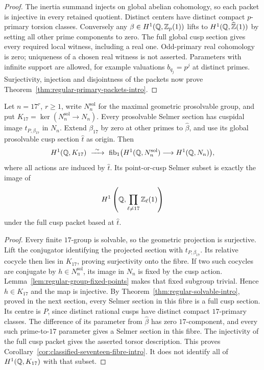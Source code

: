 \begin{proof}
The inertia summand injects on global abelian cohomology, so each
packet is injective in every retained quotient. Distinct centers
have distinct compact $p$-primary torsion classes.
Conversely any $\beta\in H^1(\mathbb Q,\mathbb Z_p(1))$ lifts to
$H^1(\mathbb Q,\widehat{\mathbb Z}(1))$ by setting all other prime components to zero.
The full global cusp section gives every required local witness,
including a real one. Odd-primary real cohomology is zero;
uniqueness of a chosen real witness is not asserted.
Parameters with infinite support are allowed, for example
valuations $b_{q_j}=p^j$ at distinct primes.
Surjectivity, injection and disjointness of the packets now prove
Theorem~\ref{thm:regular-primary-packets-intro}.
\end{proof}

\begin{corollary}
\label{cor:classified-seventeen-kernel-fibre}
Let $n=17^r$, $r\ge1$, write $N_n^{\mathrm{sol}}$ for the
maximal geometric prosolvable group, and put
$K_{17}=\ker(N_n^{\mathrm{sol}}\to N_n)$.
Every prosolvable Selmer section has cuspidal image
$t_{P,\beta_{17}}$ in $N_n$.
Extend $\beta_{17}$ by zero at other primes to $\widehat\beta$,
and use its global prosolvable cusp section $\widehat t$ as origin.
Then
\[
 H^1(\Q,K_{17})\ \xrightarrow{\ \sim\ }\
 \operatorname{fib}_{1}\bigl(H^1(\Q,N_n^{\mathrm{sol}})
                    \longrightarrow H^1(\Q,N_n)\bigr),
\]
where all actions are induced by $\widehat t$.
Its point-or-cusp Selmer subset is exactly the image of
\[
 H^1\left(\mathbb Q,\prod_{\ell\ne17}\mathbb Z_\ell(1)\right)
\]
under the full cusp packet based at \(\widehat t\).
\end{corollary}
\begin{proof}
Every finite $17$-group is solvable, so the geometric projection
is surjective. Lift the conjugator identifying the projected
section with $t_{P,\beta_{17}}$. Its relative cocycle then lies
in $K_{17}$, proving surjectivity onto the fibre.
If two such cocycles are conjugate by $h\in N_n^{\mathrm{sol}}$,
its image in $N_n$ is fixed by the cusp action.
Lemma~\ref{lem:regular-group-fixed-points} makes that fixed subgroup
trivial. Hence $h\in K_{17}$ and the map is injective.
By Theorem~\ref{thm:regular-solvable-intro}, proved in the next
section, every Selmer section in this fibre is a full cusp section.
Its centre is \(P\), since distinct rational cusps have distinct
compact \(17\)-primary classes. The difference of its parameter
from \(\widehat\beta\) has zero \(17\)-component, and every such
prime-to-\(17\) parameter gives a Selmer section in this fibre.
The injectivity of the full cusp packet gives the asserted torsor
description. This proves
Corollary~\ref{cor:classified-seventeen-fibre-intro}.
It does not identify all of \(H^1(\mathbb Q,K_{17})\) with that subset.
\end{proof}
